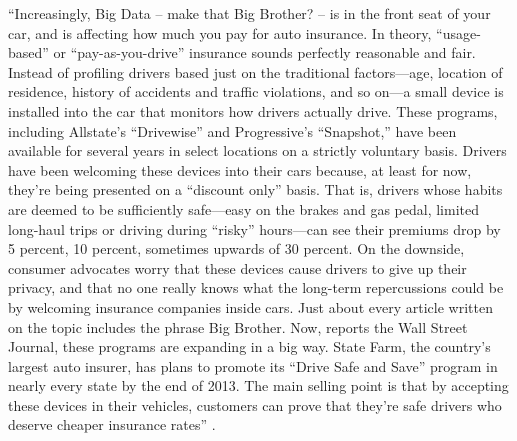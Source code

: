 ``Increasingly, Big Data – make that Big Brother? – is in the front seat of your car, and is affecting how much you pay for auto insurance. In theory, “usage-based” or “pay-as-you-drive” insurance sounds perfectly reasonable and fair. Instead of profiling drivers based just on the traditional factors—age, location of residence, history of accidents and traffic violations, and so on—a small device is installed into the car that monitors how drivers actually drive. These programs, including Allstate’s “Drivewise” and Progressive’s “Snapshot,” have been available for several years in select locations on a strictly voluntary basis. Drivers have been welcoming these devices into their cars because, at least for now, they’re being presented on a “discount only” basis. That is, drivers whose habits are deemed to be sufficiently safe—easy on the brakes and gas pedal, limited long-haul trips or driving during “risky” hours—can see their premiums drop by 5 percent, 10 percent, sometimes upwards of 30 percent. On the downside, consumer advocates worry that these devices cause drivers to give up their privacy, and that no one really knows what the long-term repercussions could be by welcoming insurance companies inside cars. Just about every article written on the topic includes the phrase Big Brother. Now, reports the Wall Street Journal, these programs are expanding in a big way. State Farm, the country’s largest auto insurer, has plans to promote its “Drive Safe and Save” program in nearly every state by the end of 2013. The main selling point is that by accepting these devices in their vehicles, customers can prove that they’re safe drivers who deserve cheaper insurance rates'' \cite{Tuttle2013habits}.

